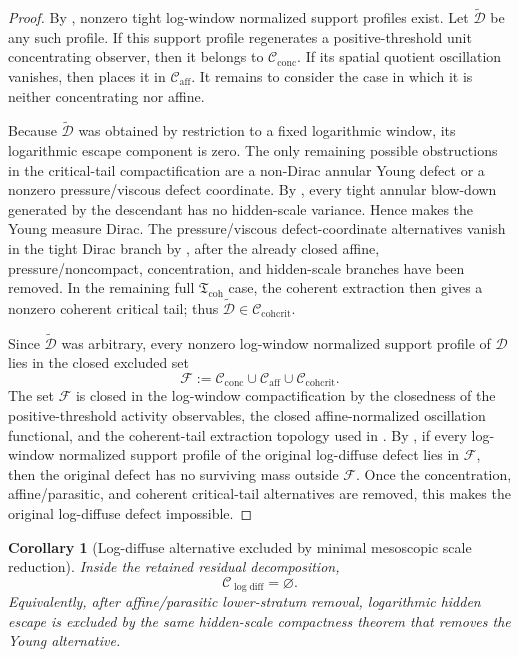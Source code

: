 \documentclass[11pt]{amsart}
\numberwithin{equation}{section}
\theoremstyle{plain}
\newtheorem{corollary}[corollary]{Corollary}
\theoremstyle{definition}
\theoremstyle{remark}
\newcommand{\Cactive}{\mathcal C_{\mathrm{conc}}}
\newcommand{\Caff}{\mathcal C_{\mathrm{aff}}}
\newcommand{\Ccohcrit}{\mathcal C_{\mathrm{cohcrit}}}
\newcommand{\Tcoh}{\mathfrak T_{\mathrm{coh}}}
\newcommand{\Clogdiff}{\mathcal C_{\log\mathrm{diff}}}
\begin{document}
\begin{proof}
By
, nonzero tight log-window
normalized support profiles exist.  Let \(\widetilde{\mathcal D}\) be any such
profile.  If this support profile regenerates a
positive-threshold unit concentrating observer, then it belongs to \(\Cactive\).  If
its spatial quotient oscillation vanishes, then
 places it in \(\Caff\).  It remains
to consider the case in which it is neither concentrating nor affine.

Because \(\widetilde{\mathcal D}\) was obtained by restriction to a fixed
logarithmic window, its logarithmic escape component is zero.  The only
remaining possible obstructions in the critical-tail compactification are a
non-Dirac annular Young defect or a nonzero pressure/viscous defect coordinate.
By
, every tight annular
blow-down generated by the descendant has no hidden-scale variance.  Hence
 makes the Young measure Dirac.
The pressure/viscous defect-coordinate alternatives vanish in the tight Dirac
branch by , after the already
closed affine, pressure/noncompact, concentration, and hidden-scale branches have
been removed.  In the remaining full \(\Tcoh\) case, the coherent extraction
 then gives a nonzero coherent
critical tail; thus \(\widetilde{\mathcal D}\in\Ccohcrit\).

Since \(\widetilde{\mathcal D}\) was arbitrary, every nonzero log-window
normalized support profile of \(\mathcal D\) lies in the closed excluded set
\[
   \mathcal F:=\Cactive\cup\Caff\cup\Ccohcrit .
\]
The set \(\mathcal F\) is closed in the log-window compactification by the
closedness of the positive-threshold activity observables, the closed
affine-normalized oscillation functional, and the coherent-tail extraction
topology used in .
By , if every log-window normalized
support profile of the original log-diffuse defect lies in \(\mathcal F\), then the
original defect has no surviving mass outside \(\mathcal F\).  Once the concentration,
affine/parasitic, and coherent critical-tail alternatives are removed, this
makes the original log-diffuse defect impossible.
\end{proof}

\begin{corollary}[Log-diffuse alternative excluded by minimal mesoscopic scale reduction]
\label{cor:log-diffuse-branch-exclusion}
Inside the retained residual decomposition,
\[
   \Clogdiff=\varnothing .
\]
Equivalently, after affine/parasitic lower-stratum removal, logarithmic hidden
escape is excluded by the same hidden-scale compactness theorem that removes
the Young alternative.
\end{corollary}
\end{document}

